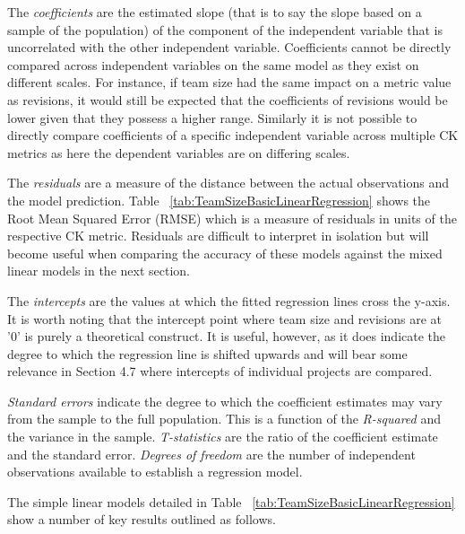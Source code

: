The \textit{coefficients} are the estimated slope (that is to say the slope based on a sample of the population) of the component of the independent variable that is uncorrelated with the other independent variable. Coefficients cannot be directly compared across independent variables on the same model as they exist on different scales. For instance, if team size had the same impact on a metric value as revisions, it would still be expected that the coefficients of revisions would be lower given that they possess a higher range. Similarly it is not possible to directly compare coefficients of a specific independent variable across multiple CK metrics as here the dependent variables are on differing scales.

The \textit{residuals} are a measure of the distance between the actual observations and the model prediction. Table ~\ref{tab:TeamSizeBasicLinearRegression} shows the Root Mean Squared Error (RMSE) which is a measure of residuals in units of the respective CK metric. Residuals are difficult to interpret in isolation but will become useful when comparing the accuracy of these models against the mixed linear models in the next section.

The \textit{intercepts} are the values at which the fitted regression lines cross the y-axis. It is worth noting that the intercept point where team size and revisions are at '0' is purely a theoretical construct. It is useful, however, as it does indicate the degree to which the regression line is shifted upwards and will bear some relevance in Section 4.7 where intercepts of individual projects are compared.

\textit{Standard errors} indicate the degree to which the coefficient estimates may vary from the sample to the full population. This is a function of the \textit{R-squared} and the variance in the sample. \textit{T-statistics} are the ratio of the coefficient estimate and the standard error.  \textit{Degrees of freedom} are the number of independent observations available to establish a regression model.

The simple linear models detailed in Table ~\ref{tab:TeamSizeBasicLinearRegression} show a number of key results outlined as follows.

